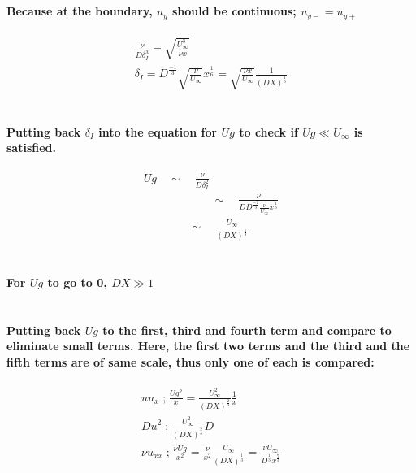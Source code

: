 \documentclass[11pt]{amsart}
\begin{document}
\paragraph{ \\Because at the boundary, \(u_{y}\) should be continuous; \(u_{y-} = u_{y+} \) \\}
\begin{gather}
\frac{\nu}{D \delta_I ^3}=\sqrt{\frac{U_\infty^3}{\nu x}}  \nonumber \\
\delta_I =D^\frac{-1}{3}\sqrt{\frac{\nu}{U_\infty} }x^\frac{1}{6}= \sqrt{\frac{\nu x}{U_\infty}} \frac{1}{(DX)^\frac{1}{3}}  \nonumber
\end{gather}
\paragraph{ \\Putting back \(\delta_I\) into the equation for \(Ug\) to check if \(Ug \ll U_\infty \) is satisfied.\\}
\begin{gather}
Ug \quad \sim \quad \frac{\nu}{D\delta_I ^2} \nonumber \\
\qquad \qquad \qquad \sim \quad \frac{\nu}{DD^\frac{-2}{3}\frac{\nu}{U_\infty}x^\frac{1}{3} }\nonumber \\
\qquad \qquad \sim \quad \frac{U_\infty}{(DX)^\frac{1}{3}}\nonumber
\end{gather}
\paragraph{\\ For \(Ug\) to go to 0, \(DX \gg 1\)}
\paragraph{\\Putting back \(Ug\) to the first, third and fourth term and compare to eliminate small terms. Here, the first two terms and the third and the fifth terms are of same scale, thus only one of each is compared: \\}
\begin{gather}
uu_{x}\; \text{;} \; \frac{Ug^2}{x} = \frac{U_\infty^2}{(DX)^\frac{2}{3}}\frac{1}{x}  \\
Du^2\; \text{;} \; \frac{U_\infty^2}{(DX)^\frac{2}{3}}D   \\
\nu u_{xx} \; \text{;} \; \frac{\nu Ug}{x^2} = \frac{\nu}{x^2} \frac{U_\infty}{(DX)^\frac{1}{3}} = \frac{\nu U_\infty}{D^\frac{1}{3}x^\frac{7}{3}}
\end{gather}
\end{document}
